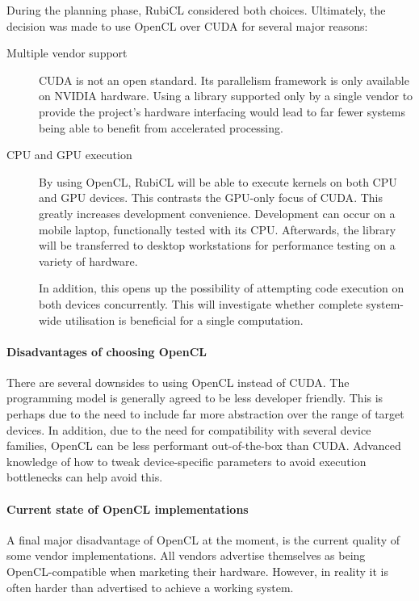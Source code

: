During the planning phase, RubiCL considered both choices. Ultimately, the decision was made to use \ac{OpenCL} over \ac{CUDA} for several major reasons:

\begin{description}
  \item[Multiple vendor support]
    \ac{CUDA} is not an open standard. Its parallelism framework is only available on NVIDIA hardware. Using a library supported only by a single vendor to provide the project's hardware interfacing would lead to far fewer systems being able to benefit from accelerated processing.

  \item[CPU and GPU execution]
    By using \ac{OpenCL}, RubiCL will be able to execute kernels on both \ac{CPU} and \ac{GPU} devices. This contrasts the \ac{GPU}-only focus of \ac{CUDA}.
    This greatly increases development convenience. Development can occur on a mobile laptop, functionally tested with its \ac{CPU}. Afterwards, the library will be transferred to desktop workstations for performance testing on a variety of hardware.

    In addition, this opens up the possibility of attempting code execution on both devices concurrently. This will investigate whether complete system-wide utilisation is beneficial for a single computation.
  \end{description}

  \paragraph*{Disadvantages of choosing \ac{OpenCL}}
  There are several downsides to using \ac{OpenCL} instead of \ac{CUDA}. The programming model is generally agreed to be less developer friendly. This is perhaps due to the need to include far more abstraction over the range of target devices. In addition, due to the need for compatibility with several device families, \ac{OpenCL} can be less performant out-of-the-box than \ac{CUDA}. Advanced knowledge of how to tweak device-specific parameters to avoid execution bottlenecks can help avoid this.

  \paragraph*{Current state of OpenCL implementations}
  A final major disadvantage of \ac{OpenCL} at the moment, is the current quality of some vendor implementations. All vendors advertise themselves as being \ac{OpenCL}-compatible when marketing their hardware. However, in reality it is often harder than advertised to achieve a working system.

